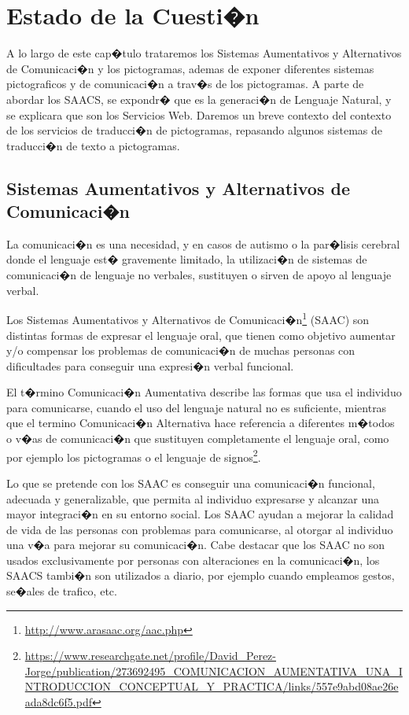 
\chapter{Estado de la Cuesti�n}
\label{cap:estadoDeLaCuestion}


	A lo largo de este cap�tulo trataremos los Sistemas Aumentativos y Alternativos de Comunicaci�n y los pictogramas, ademas de exponer diferentes sistemas pictograficos y de comunicaci�n a trav�s de los pictogramas. A parte de abordar los SAACS, se expondr� que es la generaci�n de Lenguaje Natural, y se explicara que son los Servicios Web. Daremos un breve contexto del contexto de los servicios de traducci�n de pictogramas, repasando algunos sistemas de traducci�n de texto a pictogramas. 


\section{Sistemas Aumentativos y Alternativos de Comunicaci�n}
\label{cap2:sec:Sistemas Aumentativos y Alternativos de Comunicaci�n}


La comunicaci�n es una necesidad, y en casos de autismo o la par�lisis cerebral donde el lenguaje est� gravemente limitado, la utilizaci�n de sistemas de comunicaci�n de lenguaje no verbales, sustituyen o sirven de apoyo al lenguaje verbal. 

Los Sistemas Aumentativos y Alternativos de Comunicaci�n\footnote{\url{http://www.arasaac.org/aac.php}} (SAAC) son distintas formas de expresar el lenguaje oral, que tienen como objetivo aumentar y/o compensar los problemas de comunicaci�n de muchas personas con dificultades para conseguir una expresi�n verbal funcional.

El t�rmino Comunicaci�n Aumentativa describe las formas que usa el individuo para comunicarse, cuando el uso del lenguaje natural no es suficiente, mientras que el termino Comunicaci�n Alternativa hace referencia a diferentes m�todos o v�as de comunicaci�n que sustituyen completamente el lenguaje oral, como por ejemplo los pictogramas o el lenguaje de signos\footnote{\url{https://www.researchgate.net/profile/David_Perez-Jorge/publication/273692495_COMUNICACION_AUMENTATIVA_UNA_INTRODUCCION_CONCEPTUAL_Y_PRACTICA/links/557e9abd08ae26eada8dc6f5.pdf}}.

Lo que se pretende con los SAAC es conseguir una comunicaci�n funcional, adecuada y generalizable, que permita al individuo expresarse y alcanzar una mayor integraci�n en su entorno social. Los SAAC ayudan a mejorar la calidad de vida de las personas con problemas para comunicarse, al otorgar al individuo una v�a para mejorar su comunicaci�n.
Cabe destacar que los SAAC no son usados exclusivamente por  personas con alteraciones en la comunicaci�n, los SAACS tambi�n son utilizados a diario, por ejemplo cuando empleamos gestos, se�ales de trafico, etc.

